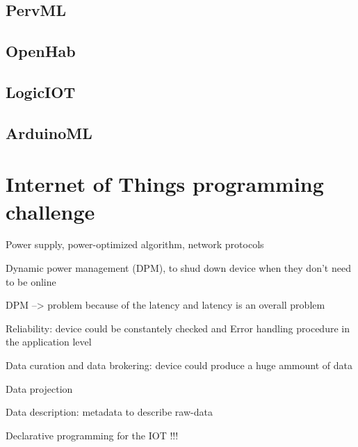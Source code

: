 \subsection{PervML}
\label{subsec:pervml}

\subsection{OpenHab}
\label{subsec:openhab}

\subsection{LogicIOT}
\label{subsec:logic-iot}

\subsection{ArduinoML}
\label{subsec:arduino-ml}

\section{Internet of Things programming challenge}
\label{sec:iot-prog-challenge}

Power supply, power-optimized algorithm, network protocols

Dynamic power management (DPM), to shud down device when they don’t need to be
online

DPM --> problem because of the latency and latency is an overall problem

Reliability: device could be constantely checked and Error handling procedure
in the application level

Data curation and data brokering: device could produce a huge ammount of data

Data projection

Data description: metadata to describe raw-data

Declarative programming for the IOT !!!

